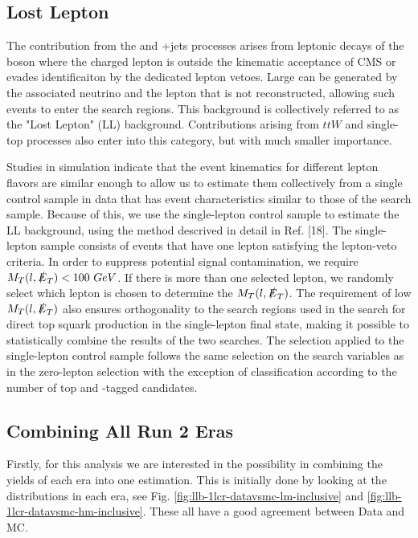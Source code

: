 \subsection{Lost Lepton}
\label{subsec:LL}

The contribution from the \ttbar{} and \W+jets processes arises from leptonic decays of the \W boson where the charged lepton is outside the kinematic acceptance of CMS or evades identificaiton by the dedicated lepton vetoes. Large \met can be generated by the associated neutrino and the lepton that is not reconstructed, allowing such events to enter the search regions. This background is collectively referred to as the "Lost Lepton" (LL) background. Contributions arising from $ttW$ and single-top processes also enter into this category, but with much smaller importance. 

Studies in simulation indicate that the event kinematics for different lepton flavors are similar enough to allow us to estimate them collectively from a single control sample in data that has event characteristics similar to those of the search sample. Because of this, we use the single-lepton control sample to estimate the LL background, using the method descrived in detail in Ref. [18]. The single-lepton sample consists of events that have one lepton satisfying the lepton-veto criteria. In order to suppress potential signal contamination, we require $M_T(l,\slashed{E}_{T})<100~GeV$. If there is more than one selected lepton, we randomly select which lepton is chosen to determine the $M_T(l,\slashed{E}_{T})$. The requirement of low $M_T(l,\slashed{E}_{T})$ also ensures orthogonality to the search regions used in the search for direct top squark production in the single-lepton final state, making it possible to statistically combine the results of the two searches. The selection applied to the single-lepton control sample follows the same selection on the search variables as in the zero-lepton selection with the exception of classification according to the number of top and \W-tagged candidates. 

\subsection{Combining All Run 2 Eras}\label{sec:LLCombination}
Firstly, for this analysis we are interested in the possibility in combining the yields of each era into one estimation. This is initially done by looking at the \met{} distributions in each era, see Fig. \ref{fig:llb-1lcr-datavsmc-lm-inclusive} and \ref{fig:llb-1lcr-datavsmc-hm-inclusive}. These all have a good agreement between Data and MC. 


